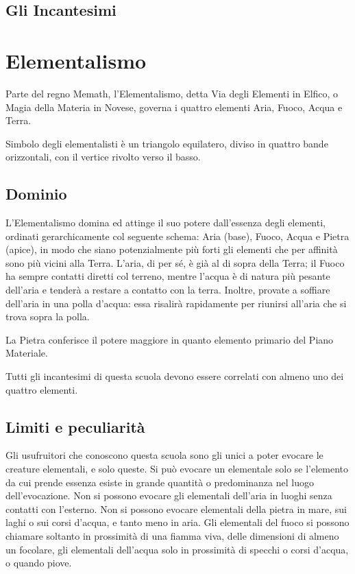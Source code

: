 \subsection{Gli Incantesimi}
\label{incdemonologia}

\vfill
\fi
\section{Elementalismo} 

Parte del regno Memath, l'Elementalismo, detta Via degli Elementi in
Elfico, o Magia della Materia in Novese, governa i quattro elementi
Aria, Fuoco, Acqua e Terra.

Simbolo degli elementalisti \`e un triangolo equilatero,
diviso in quattro bande orizzontali, con il vertice rivolto verso il
basso.

\subsection{Dominio} 

L'Elementalismo domina ed attinge il suo potere dall'essenza degli
elementi, ordinati gerarchicamente col seguente schema: Aria (base),
Fuoco, Acqua e Pietra (apice), in modo che siano potenzialmente pi\`u
forti gli elementi che per affinit\`a sono pi\`u vicini alla Terra.
L'aria, di per s\'e, \`e gi\`a al di sopra della Terra; il Fuoco ha
sempre contatti diretti col terreno, mentre l'acqua \`e di natura
pi\`u pesante dell'aria e tender\`a a restare a contatto con la terra.
Inoltre, provate a soffiare dell'aria in una polla d'acqua: essa
risalir\`a rapidamente per riunirsi all'aria che si trova sopra la
polla.

La Pietra conferisce il
potere maggiore in quanto elemento primario del Piano Materiale. 

Tutti
gli incantesimi di questa scuola devono essere correlati con almeno
uno dei quattro elementi.

\subsection{Limiti e peculiarit\`a} 

Gli usufruitori che conoscono questa scuola sono gli unici a poter
evocare le creature elementali, e solo queste. Si pu\`o evocare un
elementale solo se l'elemento da cui prende essenza esiste in grande
quantit\`a o predominanza nel luogo dell'evocazione. Non si possono
evocare gli elementali dell'aria in luoghi senza contatti con
l'esterno. Non si possono evocare elementali della pietra in mare, sui
laghi o sui corsi d'acqua, e tanto meno in aria. Gli elementali del
fuoco si possono chiamare soltanto in prossimit\`a di una fiamma
viva, delle dimensioni di almeno un focolare, gli elementali
dell'acqua solo in prossimit\`a di specchi o corsi d'acqua, o quando
piove.

